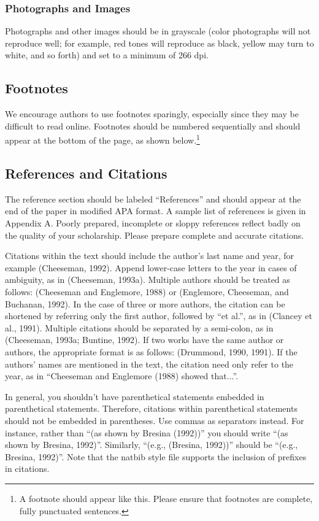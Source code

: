 \documentclass[twoside,11pt]{article}
\begin{document}
\subsubsection{Photographs and Images}
Photographs and other images should be in grayscale (color photographs will not reproduce well; for example, red tones will reproduce as black, yellow may turn to white, and so forth) and set to a minimum of 266 dpi.

\subsection{Footnotes}
We encourage authors to use footnotes sparingly, especially since they may be difficult to read online. Footnotes should be numbered sequentially and should appear at the bottom of the page, as shown below.\footnote{A footnote should appear like this.  Please ensure that footnotes are complete, fully punctuated sentences.}

\subsection{References and Citations}
The reference section should be labeled ``References'' and should appear at the end of the paper in modified APA format. A sample list of references is given in Appendix A. Poorly prepared, incomplete or sloppy references reflect badly on the quality of your scholarship. Please prepare complete and accurate citations.

Citations within the text should include the author's last name and year, for example (Cheeseman, 1992). Append lower-case letters to the year in cases of ambiguity, as in 
(Cheeseman, 1993a). Multiple authors should be treated as follows: (Cheeseman and Englemore, 1988) or (Englemore, Cheeseman, and Buchanan, 1992). In the case of three or more authors, the citation can be shortened by referring only the first author, followed by ``et al.'', as in (Clancey et al., 1991). Multiple citations should be separated by a semi-colon, as in (Cheeseman, 1993a; Buntine, 1992). If two works have the same author or authors, the appropriate format is as follows: (Drummond, 1990, 1991). If the authors' names are mentioned in the text, the citation need only refer to the year, as in ``Cheeseman and Englemore (1988) showed that...''. 

In general, you shouldn't have parenthetical statements embedded in parenthetical statements. Therefore, citations within parenthetical statements should not be embedded in parentheses. Use commas as separators instead. For instance, rather than ``(as shown by Bresina (1992))'' you should write ``(as shown by Bresina, 1992)''. Similarly, ``(e.g., (Bresina, 1992))'' should be ``(e.g., Bresina, 1992)''. Note that the natbib style file supports the inclusion of prefixes in citations. 
\end{document}
